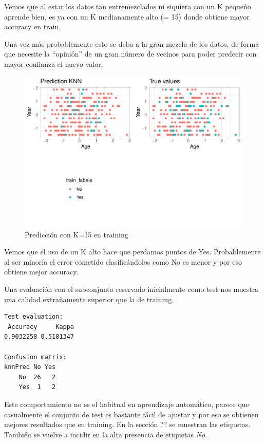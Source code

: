 Vemos que al estar los datos tan entremezclados ni siquiera con un K pequeño aprende bien, es ya con un K medianamente alto (= 15) donde obtiene mayor accuracy en train.

Una vez más probablemente esto se deba a la gran mezcla de los datos, de forma que necesite la ``opinión'' de un gran número de vecinos para poder predecir con mayor confianza el nuevo valor.

\begin{figure}[H]\center\includegraphics[width=.9\linewidth]{img/Clasificacion_files/figure-latex/unnamed-chunk-12-1}\caption{Predicción con K=15 en training}\end{figure}

Vemos que el uso de un K alto hace que perdamos puntos de Yes. Probablemente al ser minoría el error cometido clasificándolos como No es menor y por eso obtiene mejor accuracy.

\vspace{\baselineskip}

Una evaluación con el subconjunto reservado inicialmente como test nos muestra una calidad extrañamente superior que la de training.

\begin{verbatim}
Test evaluation:
 Accuracy     Kappa 
0.9032258 0.5181347 

Confusion matrix:
knnPred No Yes
    No  26   2
    Yes  1   2
\end{verbatim}

Este comportamiento no es el habitual en aprendizaje automático, parece que casualmente el conjunto de test es bastante fácil de ajustar y por eso se obtienen mejores resultados que en training.
En la sección ?? se muestran las etiquetas. También se vuelve a incidir en la alta presencia de etiquetas \textit{No}.

